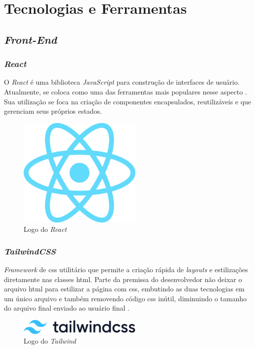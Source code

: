 \section{Tecnologias e Ferramentas} 

\subsection{\emph{Front-End}} 

\subsubsection{\emph{React}} 
O \emph{React} \cite{react} é uma biblioteca \emph{JavaScript} para construção de interfaces de usuário. Atualmente, se coloca como uma das ferramentas mais populares nesse aspecto \cite{state-of-front-end}. Sua utilização se foca na criação de componentes encapsulados, reutilizáveis e que gerenciam seus próprios estados.

\begin{figure}[htb]
	\centering
	\includegraphics[width=6cm]{cap04-desenvolvimento/images/4-4-1-1-react}
	\caption{Logo do \emph{React}}
	\label{fig:logo_react}
\end{figure}

\subsubsection{\emph{TailwindCSS}} 
\emph{Framework} de \gls{css} utilitário que permite a criação rápida de \emph{layouts} e estilizações diretamente nas classes \gls{html}. Parte da premissa do desenvolvedor não deixar o arquivo \gls{html} para estilizar a página com \gls{css}, embutindo as duas tecnologias em um único arquivo e também removendo código \gls{css} inútil, diminuindo o tamanho do arquivo final enviado ao usuário final \cite{tailwind}.

\begin{figure}[htb]
	\centering
	\includegraphics[width=6cm]{cap04-desenvolvimento/images/4-4-1-2-tailwindcss-logotype.svg}
	\caption{Logo do \emph{Tailwind}}
	\label{fig:logo_tailwind}
\end{figure}


